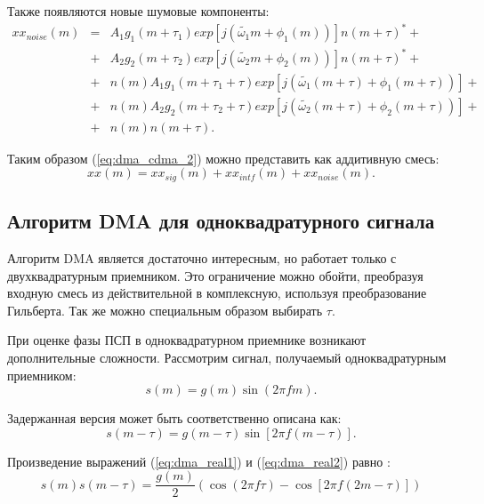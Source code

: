Также появляются новые шумовые компоненты:
\begin{eqnarray}
	\label{eq:dma_cdma_5}
	xx_{noise}(m) & = & A_{1} g_{1}(m + \tau_1) exp \left[ j \left( \tilde{\omega_1} m + \phi_{1} (m) \right) \right] n(m + \tau)^* + \nonumber \\
		& + & A_{2} g_{2}(m + \tau_2) exp \left[ j \left( \tilde{\omega_2} m + \phi_{2} (m) \right) \right] n(m + \tau)^* + \nonumber \\
		& + & n(m)A_{1} g_{1}(m + \tau_1 + \tau) exp \left[ j \left( \tilde{\omega_1} (m + \tau) + \phi_{1} (m + \tau) \right) \right] + \nonumber \\
		& + & n(m)A_{2} g_{2}(m + \tau_2 + \tau) exp \left[ j \left( \tilde{\omega_2} (m + \tau) + \phi_{2} (m + \tau) \right) \right] + \nonumber \\
		& + & n(m)n(m+\tau).
\end{eqnarray}

Таким образом (\ref{eq:dma_cdma_2}) можно представить как аддитивную смесь:
\begin{equation}
	\label{eq:dma_cdma_6}
	xx(m) = xx_{sig}(m) + xx_{intf}(m) + xx_{noise}(m).
\end{equation}

\subsection{Алгоритм DMA для одноквадратурного сигнала}
\label{sec1:dma_real}

Алгоритм DMA является достаточно интересным, но работает только с двухквадратурным приемником. Это ограничение можно
обойти, преобразуя входную смесь из действительной в комплексную, используя преобразование Гильберта.
Так же можно специальным образом выбирать ${\tau}$.

При оценке фазы ПСП в одноквадратурном приемнике возникают дополнительные сложности. Рассмотрим сигнал, получаемый одноквадратурным приемником:
\begin{equation}
	\label{eq:dma_real1}
	s(m) = g(m) \sin{(2\pi fm)}.
\end{equation}

Задержанная версия может быть соответственно описана как:
\begin{equation}
	\label{eq:dma_real2}
	s(m - \tau) = g(m - \tau) \sin{\left[2\pi f(m-\tau)\right]}.
\end{equation}

Произведение выражений (\ref{eq:dma_real1}) и (\ref{eq:dma_real2}) равно \cite{tsui}:
\begin{equation}
	\label{eq:dma_real3}
	s(m)s(m - \tau) = \frac{g(m)}{2} \left(\cos (2\pi f \tau) - \cos \left[2 \pi f (2m - \tau)\right]\right)
\end{equation}


